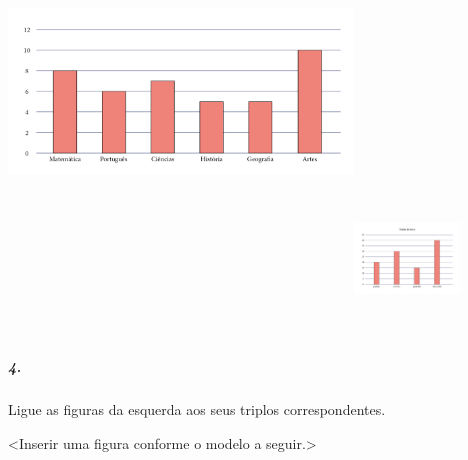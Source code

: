 \includegraphics[width=3.60298in,height=5.04167in]{media/image100.png}\includegraphics[width=1.10824in,height=1.56250in]{media/image101.png}

\subparagraph{4.}\label{section-92}

Ligue as figuras da esquerda aos seus triplos correspondentes.

\textless{}Inserir uma figura conforme o modelo a seguir.\textgreater{}

